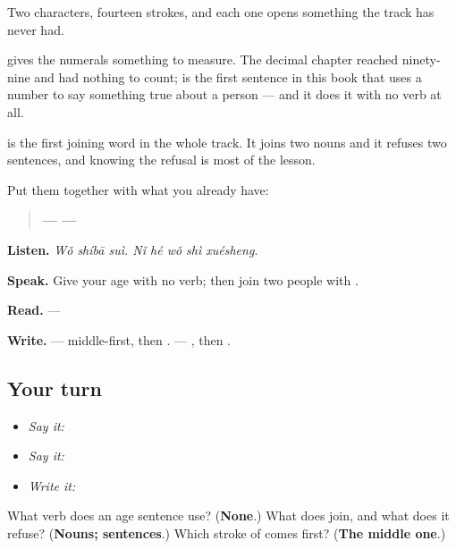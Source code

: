 \begin{grammarlens}[title={What you've built — an age, and a join}]
Two characters, fourteen strokes, and each one opens something the track has never had.

\textbf{} gives the numerals something to measure. The decimal chapter reached ninety-nine and had nothing to count;  is the first sentence in this book that uses a number to say something true about a person — and it does it with no verb at all.

\textbf{} is the first joining word in the whole track. It joins two nouns and it refuses two sentences, and knowing the refusal is most of the lesson.

Put them together with what you already have:

\begin{quote}
\textbf{ —  — } \textbf{}
\end{quote}

\textbf{Listen.} \emph{Wǒ shíbā suì. Nǐ hé wǒ shì xuésheng.}

\textbf{Speak.} Give your age with no verb; then join two people with .

\textbf{Read.}  — 

\textbf{Write.}  —  middle-first, then .  — , then .
\end{grammarlens}

\subsection*{Your turn}
\begin{itemize}
\raggedright
  \item \emph{Say it:} 
  \item \emph{Say it:} 
  \item \emph{Write it:}  
\end{itemize}

\begin{tcolorbox}[breakable,colback=teal!4,colframe=teal!35!black,title={Before you move on}]
What verb does an age sentence use? (\textbf{None}.) What does  join, and what does it refuse? (\textbf{Nouns; sentences}.) Which stroke of  comes first? (\textbf{The middle one}.)
\end{tcolorbox}
